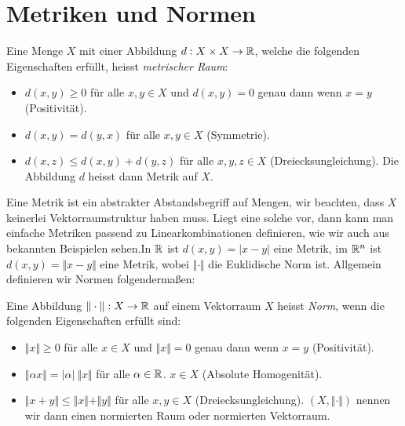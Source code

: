 \section{Metriken und Normen}
\label{\detokenize{metrik/normen:metriken-und-normen}}\label{\detokenize{metrik/normen::doc}}\label{metrik/normen:definition-0}
\begin{definition}{}{}



Eine Menge \(X\) mit einer Abbildung \(d: X \times X \rightarrow \mathbb{R}\), welche die folgenden Eigenschaften erfüllt, heisst \emph{metrischer Raum}:
\begin{itemize}
\item {} 
\(d(x,y) \geq 0\) für alle \(x,y \in X\) und \(d(x,y) = 0\) genau dann wenn \(x=y\) (Positivität).

\item {} 
\(d(x,y) = d(y,x)\) für alle \(x,y \in X\)  (Symmetrie).

\item {} 
\(d(x,z) \leq d(x,y) + d(y,z)\) für alle \(x,y,z \in X\)  (Dreiecksungleichung).
Die Abbildung \(d\) heisst dann Metrik auf \(X\).

\end{itemize}
\end{definition}

Eine Metrik ist ein abstrakter Abstandsbegriff auf Mengen, wir beachten, dass \(X\) keinerlei Vektorraumstruktur haben muss.  Liegt eine solche vor, dann kann man einfache Metriken passend zu Linearkombinationen definieren, wie wir auch aus bekannten Beispielen sehen.In \(\mathbb{R}\) ist \(d(x,y) = |x-y|\) eine Metrik, im \(\mathbb{R}^n\) ist \(d(x,y) = \Vert x -y \Vert \) eine Metrik, wobei \(\Vert \cdot \Vert\) die Euklidische Norm ist. Allgemein definieren wir Normen folgendermaßen:
\label{metrik/normen:definition-1}
\begin{definition}{}{}



Eine Abbildung \(\Vert \cdot \Vert:X\rightarrow \mathbb{R}\) auf einem Vektorraum \(X\) heisst \emph{Norm}, wenn die folgenden Eigenschaften erfüllt sind:
\begin{itemize}
\item {} 
\(\Vert x \Vert \geq 0\) für alle \(x \in X\) und \(\Vert x \Vert = 0\) genau dann wenn \(x=y\) (Positivität).

\item {} 
\(\Vert \alpha x \Vert = |\alpha|~\Vert x \Vert\) für alle \(\alpha \in \mathbb{R}\). \(x\in X\)  (Absolute Homogenität).

\item {} 
\(\Vert x+y \Vert \leq\Vert x  \Vert + \Vert y  \Vert\) für alle \(x,y  \in X\)  (Dreiecksungleichung).
\((X,\Vert \cdot \Vert)\)  nennen wir dann einen normierten Raum oder normierten Vektorraum.

\end{itemize}
\end{definition}

